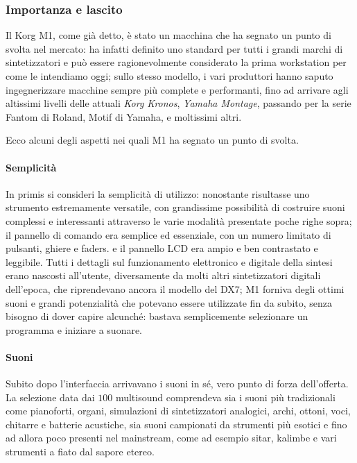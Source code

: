 \documentclass[12pt]{article}
\begin{document}
\subsubsection{Importanza e lascito}
Il Korg M1, come già detto, è stato un macchina che ha segnato un punto di svolta nel mercato: ha infatti definito uno standard per tutti i grandi marchi di sintetizzatori e può essere ragionevolmente considerato la prima workstation per come le intendiamo oggi; sullo stesso modello, i vari produttori hanno saputo ingegnerizzare macchine sempre più complete e performanti, fino ad arrivare agli altissimi livelli delle attuali \emph{Korg Kronos}, \emph{Yamaha Montage}, passando per la serie Fantom di Roland, Motif di Yamaha, e moltissimi altri.

Ecco alcuni degli aspetti nei quali M1 ha segnato un punto di svolta.

\paragraph{Semplicità}
In primis si consideri la semplicità di utilizzo: nonostante risultasse uno strumento estremamente versatile, con grandissime possibilità di costruire suoni complessi e interessanti attraverso le varie modalità presentate poche righe sopra; il pannello di comando era semplice ed essenziale, con un numero limitato di pulsanti, ghiere e faders. e il pannello LCD era ampio e ben contrastato e leggibile. Tutti i dettagli sul funzionamento elettronico e digitale della sintesi erano nascosti all'utente, diversamente da molti altri sintetizzatori digitali dell'epoca, che riprendevano ancora il modello del DX7; M1 forniva degli ottimi suoni e grandi potenzialità che potevano essere utilizzate fin da subito, senza bisogno di dover capire alcunché: bastava semplicemente selezionare un programma e iniziare a suonare.

\paragraph{Suoni}
Subito dopo l'interfaccia arrivavano i suoni in sé, vero punto di forza dell'offerta. La selezione data dai \(100\) multisound comprendeva sia i suoni più tradizionali come pianoforti, organi, simulazioni di sintetizzatori analogici, archi, ottoni, voci, chitarre e batterie acustiche, sia suoni campionati da strumenti più esotici e fino ad allora poco presenti nel mainstream, come ad esempio sitar, kalimbe e vari strumenti a fiato dal sapore etereo.
\end{document}
